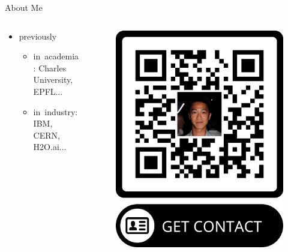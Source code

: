 \documentclass[final,hyperref={pdfpagelabels=false}]{beamer}
\begin{document}
\begin{frame}[t]
\begin{columns}[t]
\begin{column}{.465\textwidth}
\begin{block}{About Me}
\begin{columns}
\begin{column}{.65\textwidth}
\begin{itemize}
\item previously
    \begin{itemize}
	\item in~academia: Charles University, EPFL$\dots$
	\item in~industry: IBM, CERN, H2O.ai$\dots$
    \end{itemize}
\end{itemize}
\end{column}

\begin{column}{.35\textwidth} %
\centering
\begin{figure}
\includegraphics[width=0.95\linewidth]{figures/qr_Karel_Ha.png}
\end{figure}
\end{column}


\end{columns}
\end{block}
\end{column}
\end{columns}
\end{frame}
\end{document}
